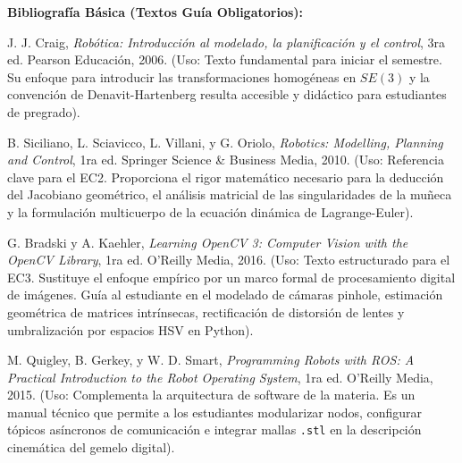 \documentclass[11pt, letterpaper]{article}
\begin{document}
\textbf{Bibliografía Básica (Textos Guía Obligatorios):}
\begin{enumerate}[label={[\arabic*]}, leftmargin=*, nosep]
    \item J. J. Craig, \textit{Robótica: Introducción al modelado, la planificación y el control}, 3ra ed. Pearson Educación, 2006. (Uso: Texto fundamental para iniciar el semestre. Su enfoque para introducir las transformaciones homogéneas en $SE(3)$ y la convención de Denavit-Hartenberg resulta accesible y didáctico para estudiantes de pregrado).
    
    \item B. Siciliano, L. Sciavicco, L. Villani, y G. Oriolo, \textit{Robotics: Modelling, Planning and Control}, 1ra ed. Springer Science \& Business Media, 2010. (Uso: Referencia clave para el EC2. Proporciona el rigor matemático necesario para la deducción del Jacobiano geométrico, el análisis matricial de las singularidades de la muñeca y la formulación multicuerpo de la ecuación dinámica de Lagrange-Euler).
    
    \item G. Bradski y A. Kaehler, \textit{Learning OpenCV 3: Computer Vision with the OpenCV Library}, 1ra ed. O'Reilly Media, 2016. (Uso: Texto estructurado para el EC3. Sustituye el enfoque empírico por un marco formal de procesamiento digital de imágenes. Guía al estudiante en el modelado de cámaras pinhole, estimación geométrica de matrices intrínsecas, rectificación de distorsión de lentes y umbralización por espacios HSV en Python).
    
    \item M. Quigley, B. Gerkey, y W. D. Smart, \textit{Programming Robots with ROS: A Practical Introduction to the Robot Operating System}, 1ra ed. O'Reilly Media, 2015. (Uso: Complementa la arquitectura de software de la materia. Es un manual técnico que permite a los estudiantes modularizar nodos, configurar tópicos asíncronos de comunicación e integrar mallas \texttt{.stl} en la descripción cinemática del gemelo digital).
\end{enumerate}
\end{document}
